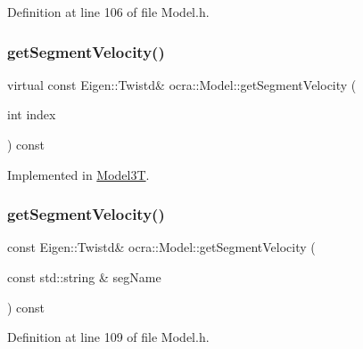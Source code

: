 Definition at line 106 of file Model.\+h.

\hypertarget{classocra_1_1Model_a1ee3b57487621c5194b7d6b014308e40}{}\label{classocra_1_1Model_a1ee3b57487621c5194b7d6b014308e40} 
\subsubsection{\texorpdfstring{get\+Segment\+Velocity()}{getSegmentVelocity()}\hspace{0.1cm}{\footnotesize\ttfamily [1/2]}}
{\footnotesize\ttfamily virtual const Eigen\+::\+Twistd\& ocra\+::\+Model\+::get\+Segment\+Velocity (\begin{DoxyParamCaption}\item[{int}]{index }\end{DoxyParamCaption}) const\hspace{0.3cm}{\ttfamily [pure virtual]}}



Implemented in \hyperlink{classModel3T_ac94524afc47ca5c16045b53d6c5b6118}{Model3T}.

\hypertarget{classocra_1_1Model_a01f56bca692e0907a641f0dce70e6ed2}{}\label{classocra_1_1Model_a01f56bca692e0907a641f0dce70e6ed2} 
\subsubsection{\texorpdfstring{get\+Segment\+Velocity()}{getSegmentVelocity()}\hspace{0.1cm}{\footnotesize\ttfamily [2/2]}}
{\footnotesize\ttfamily const Eigen\+::\+Twistd\& ocra\+::\+Model\+::get\+Segment\+Velocity (\begin{DoxyParamCaption}\item[{const std\+::string \&}]{seg\+Name }\end{DoxyParamCaption}) const\hspace{0.3cm}{\ttfamily [inline]}}



Definition at line 109 of file Model.\+h.

\hypertarget{classocra_1_1Model_adceb9df8746c94bd72e1d5035e368eae}{}\label{classocra_1_1Model_adceb9df8746c94bd72e1d5035e368eae} 

